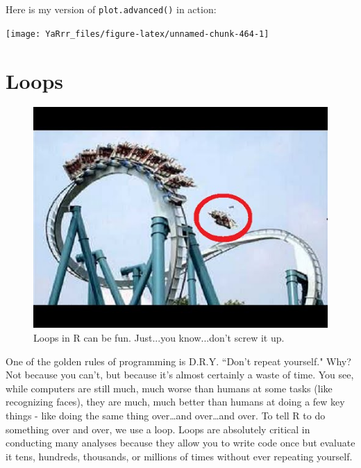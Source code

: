 \documentclass[]{book}
\newenvironment{Shaded}{\begin{snugshade}}{\end{snugshade}}
\newcommand{\KeywordTok}[1]{\textcolor[rgb]{0.13,0.29,0.53}{\textbf{#1}}}
\newcommand{\DataTypeTok}[1]{\textcolor[rgb]{0.13,0.29,0.53}{#1}}
\newcommand{\OtherTok}[1]{\textcolor[rgb]{0.56,0.35,0.01}{#1}}
\newcommand{\OperatorTok}[1]{\textcolor[rgb]{0.81,0.36,0.00}{\textbf{#1}}}
\newcommand{\NormalTok}[1]{#1}
\theoremstyle{definition}
\theoremstyle{definition}
\theoremstyle{remark}
\begin{document}
Here is my version of \texttt{plot.advanced()} in action:

\begin{Shaded}
\end{Shaded}

\begin{center}\texttt{[image: YaRrr\_files/figure-latex/unnamed-chunk-464-1]} \end{center}

\chapter{Loops}\label{loops}

\begin{figure}

{\centering \includegraphics[width=0.6\linewidth]{images/coasteraccident} 

}

\caption{Loops in R can be fun. Just...you know...don't screw it up.}\label{fig:unnamed-chunk-466}
\end{figure}

One of the golden rules of programming is D.R.Y. ``Don't repeat
yourself." Why? Not because you can't, but because it's almost certainly
a waste of time. You see, while computers are still much, much worse
than humans at some tasks (like recognizing faces), they are much, much
better than humans at doing a few key things - like doing the same thing
over\ldots{}and over\ldots{}and over. To tell R to do something over and
over, we use a loop. Loops are absolutely critical in conducting many
analyses because they allow you to write code once but evaluate it tens,
hundreds, thousands, or millions of times without ever repeating
yourself.
\end{document}
